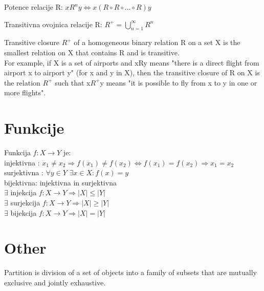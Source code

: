 \documentclass{article}
\begin{document}
Potence relacije R: $xR^{n}y \Leftrightarrow x(R \circ R \circ ... \circ R)y$

Transitivna ovojnica relacije R: $R^{+} = \bigcup_{n=1}^{\infty} R^{n}$

Transitive closure $R^{+}$ of a homogeneous binary relation R on a set X is the smallest relation on X that contains R and is transitive.\\
For example, if X is a set of airports and xRy means "there is a direct flight from airport x to airport y" (for x and y in X), then the transitive closure of R on X is the relation $R^+$ such that x$R^+$y means "it is possible to fly from x to y in one or more flights".


\section { Funkcije }
Funkcija $f: X \rightarrow Y$ je: \\
injektivna : $x_1 \neq x_2 \Rightarrow f(x_1) \neq f(x_2) \Leftrightarrow f(x_1) = f(x_2) \Rightarrow x_1 = x_2$ \\
surjektivna : $\forall y \in Y$ $\exists x \in X: f(x) = y$ \\
bijektivna: injektivna in surjektivna \\
$\exists$ injekcija $f: X \rightarrow Y \Rightarrow |X| \leq |Y|$ \\
$\exists$ surjekcija $f: X \rightarrow Y \Rightarrow |X| \geq |Y|$ \\
$\exists$ bijekcija $f: X \rightarrow Y \Rightarrow |X| = |Y|$ \\

\section { Other }
Partition is division of a set of objects into a family of subsets that are mutually exclusive and jointly exhaustive.
\end{document}
